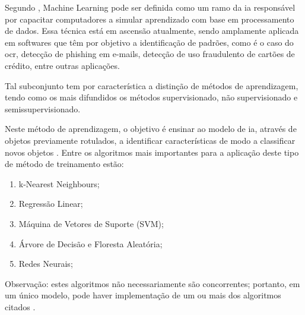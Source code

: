 Segundo , Machine Learning pode ser 
definida como um ramo da \gls{ia} responsável por capacitar computadores
a simular aprendizado com base em processamento de dados. 
Essa técnica está em ascensão atualmente, sendo amplamente aplicada em softwares que 
têm por objetivo a identificação de padrões, como é o caso do \gls{ocr},
detecção de phishing em e-mails, detecção de uso fraudulento de cartões de crédito, 
entre outras aplicações.

Tal subconjunto tem por característica a distinção de métodos de aprendizagem, 
tendo como os mais difundidos os métodos supervisionado, 
não supervisionado e semissupervisionado.


Neste método de aprendizagem, o objetivo é ensinar ao modelo de \gls{ia}, 
através de objetos previamente rotulados, a identificar características de modo a 
classificar novos objetos \cite{SilvaVilela2021}. 
Entre os algoritmos mais importantes para a aplicação deste tipo de 
método de treinamento estão:

\begin{enumerate}
	\item k-Nearest Neighbours;
    \item Regressão Linear;
    \item Máquina de Vetores de Suporte (SVM);
    \item Árvore de Decisão e Floresta Aleatória;
    \item Redes Neurais;
\end{enumerate}

Observação: estes algoritmos não necessariamente são concorrentes; 
portanto, em um único modelo, pode haver implementação de um ou mais 
dos algoritmos citados \cite{SilvaVilela2021}.

